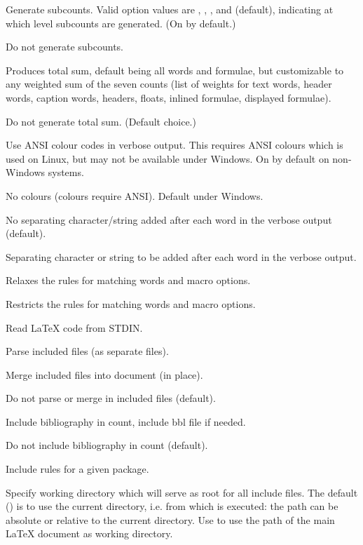 \begin{description}
\option[-sub\alt{=\ldots}, -subcount\alt{=\ldots}]Generate subcounts. Valid option values are , , ,  and  (default), indicating at which level subcounts are generated. (On by default.)

\option[-nosub]Do not generate subcounts.

\option[-sum\alt{=n,n,\ldots}]Produces total sum, default being all words and formulae, but customizable to any weighted sum of the seven counts (list of weights for text words, header words, caption words, headers, floats, inlined formulae, displayed formulae).

\option[-nosum]Do not generate total sum. (Default choice.)

\option[-col]Use ANSI colour codes in verbose output. This requires ANSI colours which is used on Linux, but may not be available under Windows. On by default on non-Windows systems.

\option[-nc, -nocol]No colours (colours require ANSI). Default under Windows.

No separating character/string added after each word in the verbose output (default).

\option[-sep=, -separator=]Separating character or string to be added after each word in the verbose output.

\option[-relaxed]Relaxes the rules for matching words and macro options.

\option[-restricted]Restricts the rules for matching words and macro options.

\option[-]Read \LaTeX{} code from STDIN.

\option[-inc]Parse included files (as separate files).

\option[-merge]Merge included files into document (in place).

\option[-noinc]Do not parse or merge in included files (default).

\option[-incbib]Include bibliography in count, include bbl file if needed.

\option[-nobib]Do not include bibliography in count (default).

\option[-incpackage=]Include rules for a given package.

\option[-dir\alt{=\ldots}]Specify working directory which will serve as root for all include files. The default () is to use the current directory, i.e. from which \TeXcount{} is executed: the path can be absolute or relative to the current directory. Use  to use the path of the main \LaTeX{} document as working directory.


\end{description}
